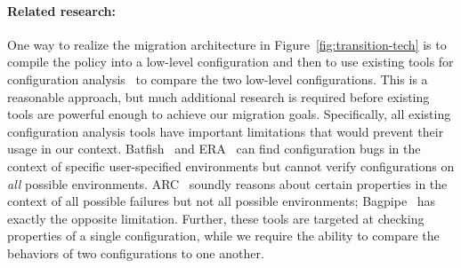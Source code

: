 
\paragraph*{Related research:}  
One way to realize the migration architecture in Figure~\ref{fig:transition-tech} is to compile the \Name policy into a low-level configuration
and then to use existing tools for configuration analysis~\cite{batfish,arc,bagpipe,era} to compare the two low-level configurations.  This is a reasonable approach, but much additional research is required before existing
tools are powerful enough to achieve our migration goals.  Specifically, all existing configuration analysis tools have important limitations that would prevent their usage in our context.  Batfish~\cite{batfish} and ERA~\cite{era} can find configuration bugs in the context of specific user-specified environments but cannot verify configurations on \emph{all} possible environments.  ARC~\cite{arc} soundly reasons about certain properties in the context of all possible failures but not all possible environments; Bagpipe~\cite{bagpipe} has exactly the opposite limitation.  
Further, these tools are targeted at checking properties of a single configuration, while we require the ability to compare the behaviors of two configurations to one another.

